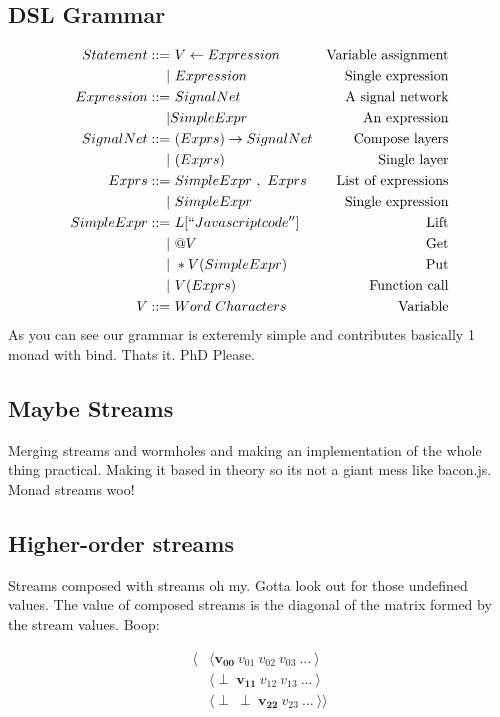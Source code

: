 \documentclass[twocolumn,11pt,english]{article}
\begin{document}
\subsection{DSL Grammar}
\footnotesize
\begin{align*}
  Statement ::=& ~V \leftarrow Expression &\text{Variable assignment}\\
  |& ~Expression &\text{Single expression}\\
  Expression ::=& ~SignalNet &\text{A signal network}\\
  |& SimpleExpr &\text{An expression}\\
  SignalNet ::=& ~( Exprs ) \rightarrow SignalNet &\text{Compose layers}\\
   |& ~(Exprs ) &\text{Single layer} \\
  Exprs ::=& ~SimpleExpr ~,~ Exprs &\text{List of expressions}\\
  |& ~SimpleExpr &\text{Single expression}\\
  SimpleExpr ::=& ~L[``Javascript code''] &\text{Lift}\\
  |& ~ @V &\text{Get}\\
  |& ~ *V(SimpleExpr) &\text{Put}\\ 
  |& ~ V( Exprs ) &\text{Function call}\\
  V ::=& ~Word~Characters &\text{Variable}
\end{align*}
\normalsize
As you can see our grammar is exteremly simple and contributes basically 1 monad with bind. Thats it. PhD Please.

\subsection{Maybe Streams}
Merging streams and wormholes and making an implementation of the whole thing practical. Making it based in theory so its not a giant mess like bacon.js. Monad streams woo!

\subsection{Higher-order streams}
Streams composed with streams oh my. Gotta look out for those undefined values. The value of composed streams is the diagonal of the matrix formed by the stream values. Boop:

\begin{align*}
  \langle &\langle \mathbf{v_{00}} ~ v_{01} ~ v_{02} ~ v_{03} ~ ... ~ \rangle \\
  &\langle \perp ~ \mathbf{v_{11}} ~ v_{12} ~ v_{13} ~... ~ \rangle \\
  &\langle \perp ~ \perp ~ \mathbf{v_{22}} ~ v_{23} ~ ...  ~ \rangle \rangle
\end{align*}
\end{document}
